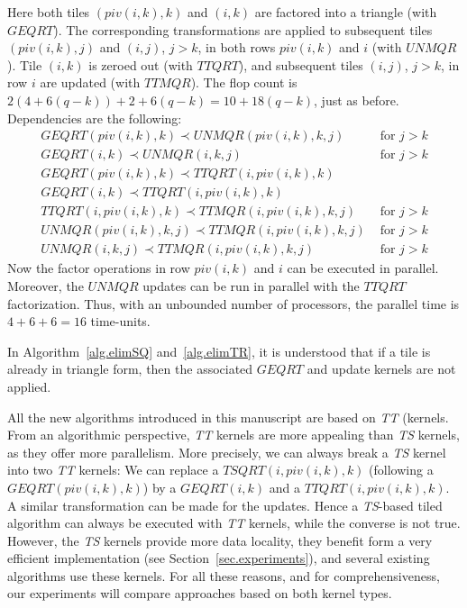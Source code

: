 \documentclass[a4paper,twopages]{article}
\newcommand{\GEQRT}{\ensuremath{\mathit{GEQRT}}\xspace}
\newcommand{\TSQRT}{\ensuremath{\mathit{TSQRT}}\xspace}
\newcommand{\UNMQR}{\ensuremath{\mathit{UNMQR}}\xspace}
\newcommand{\TTQRT}{\ensuremath{\mathit{TTQRT}}\xspace}
\newcommand{\TTMQR}{\ensuremath{\mathit{TTMQR}}\xspace}
\begin{document}
Here both tiles $(piv(i,k),k)$ and $(i,k)$ are factored into a triangle (with
\GEQRT). The corresponding transformations are applied to subsequent tiles
$(piv(i,k),j)$ and $(i,j)$, $j>k$, in both rows $piv(i,k)$ and $i$ (with \UNMQR).
Tile $(i,k)$ is zeroed out (with \TTQRT), and subsequent tiles $(i,j)$, $j>k$,
in row $i$ are updated (with \TTMQR).  The flop count is
$2(4+6(q-k))+2+6(q-k)=10+18(q-k)$, just as before.  Dependencies are the
following:
\[
\begin{array}{ll}\GEQRT(piv(i,k), k) \prec \UNMQR(piv(i,k), k, j) & \text{ for } j>k\\\GEQRT(i, k) \prec \UNMQR(i, k, j) & \text{ for } j>k\\\GEQRT(piv(i,k), k) \prec \TTQRT(i, piv(i,k), k)\\\GEQRT(i, k) \prec \TTQRT(i, piv(i,k), k)\\\TTQRT(i, piv(i,k), k) \prec \TTMQR(i, piv(i,k), k, j) & \text{ for } j>k\\\UNMQR(piv(i,k), k, j) \prec \TTMQR(i, piv(i,k), k, j) & \text{ for } j>k\\\UNMQR(i, k, j) \prec \TTMQR(i, piv(i,k), k, j) & \text{ for } j>k\end{array}\]Now the factor operations in row $piv(i,k)$ and $i$ can be executed in parallel.
Moreover, the \UNMQR updates can be run in parallel with the \TTQRT
factorization.  Thus, with an unbounded number of processors, the parallel time
is $4+6+6=16$ time-units.

\medskip
In Algorithm~\ref{alg.elimSQ} and~\ref{alg.elimTR}, it is understood that if a
tile is already in triangle form, then the associated \GEQRT and update kernels
are not applied.

All the new algorithms
introduced in this manuscript are based on \emph{TT} (kernels.  From an algorithmic perspective, \emph{TT} kernels
are more appealing than \emph{TS} kernels, as they offer more parallelism.
More precisely, we can always break a \emph{TS} kernel into two \emph{TT} kernels: We
can replace a $\TSQRT(i,piv(i,k), k)$ (following a $\GEQRT(piv(i,k), k)$) by a $\GEQRT(i, k)$ and a $\TTQRT(i, piv(i,k), k)$. A similar transformation can be made for the updates. Hence a \emph{TS}-based tiled algorithm can always be executed with \emph{TT} kernels,
while the converse is not true.
However, the \emph{TS} kernels provide more data locality, they
benefit form a very efficient implementation (see Section~\ref{sec.experiments}), and several existing
algorithms use these kernels. For all these reasons, and for comprehensiveness,
our experiments will compare approaches based on both kernel types.
\end{document}
